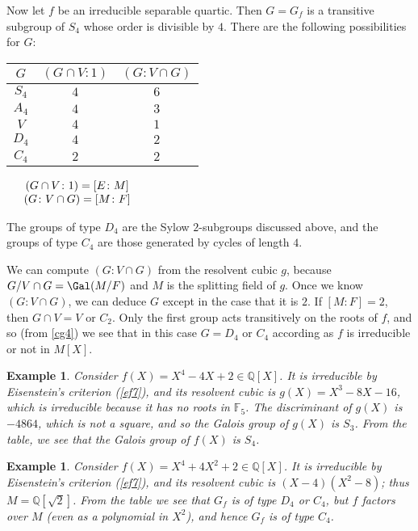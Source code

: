 \documentclass[a4paper,11pt,final,openany]{memoir}
\newtheorem{example}[X]{Example}
\theoremstyle{nonumberplain}
\begin{document}
Now let $f$ be an irreducible separable quartic. Then $G=G_{f}$ is a
transitive subgroup of $S_{4}$ whose order is divisible by $4$. There are the
following possibilities for $G$:\hfill\break

\begin{center}
\renewcommand{\arraystretch}{1.2}%
\begin{tabular}
[c]{|c|c|c|}\hline
{$G$} & {$(G\cap V\colon1)$} & {$(G\colon V\cap G)$}\\\hline
$S_{4}$ & {$4$} & {$6$}\\\hline
$A_{4}$ & {$4$} & {$3$}\\\hline
$V$ & {$4$} & {$1$}\\\hline
{$D_{4}$} & {$4$} & {$2$}\\\hline
{$C_{4}$} & {$2$} & {$2$}\\\hline
\end{tabular}
$\quad%
\begin{array}
[c]{c}%
(G\cap V\colon1)=[E\colon M]\\
(G\colon V\cap G)=[M\colon F]
\end{array}
$
\end{center}

\noindent The groups of type $D_{4}$ are the Sylow $2$-subgroups discussed
above, and the groups of type $C_{4}$ are those generated by cycles of length
$4$.

We can compute $(G\colon V\cap G)$ from the resolvent cubic $g$, because
$G/V\cap G=\Gal(M/F)$ and $M$ is the splitting field of $g$. Once we know
$(G\colon V\cap G)$, we can deduce $G$ except in the case that it is $2$. If
$[M\colon F]=2$, then $G\cap V=V$ or $C_{2}$. Only the first group acts
transitively on the roots of $f$, and so (from \ref{cg4}) we see that in this
case $G=D_{4}$ or $C_{4}$ according as $f$ is irreducible or not in $M[X]$.

\begin{example}
\label{cg8a}Consider $f(X)=X^{4}-4X+2\in\mathbb{Q}{}[X]$. It is irreducible by
Eisenstein's criterion (\ref{ef7}), and its resolvent cubic is $g(X)=X^{3}%
-8X-16$, which is irreducible because it has no roots in $\mathbb{F}{}_{5}$.
The discriminant of $g(X)$ is $-4864$, which is not a square, and so the
Galois group of $g(X)$ is $S_{3}$. From the table, we see that the Galois
group of $f(X)$ is $S_{4}$.
\end{example}

\begin{example}
\label{cg9}Consider $f(X)=X^{4}+4X^{2}+2\in\mathbb{Q}[X]$. It is irreducible
by Eisenstein's criterion (\ref{ef7}), and its resolvent cubic is
$(X-4)(X^{2}-8)$; thus $M=\mathbb{Q}[\sqrt{2}]$. From the table we see that
$G_{f}$ is of type $D_{4}$ or $C_{4}$, but $f$ factors over $M$ (even as a
polynomial in $X^{2}$), and hence $G_{f}$ is of type $C_{4}$.
\end{example}
\end{document}
